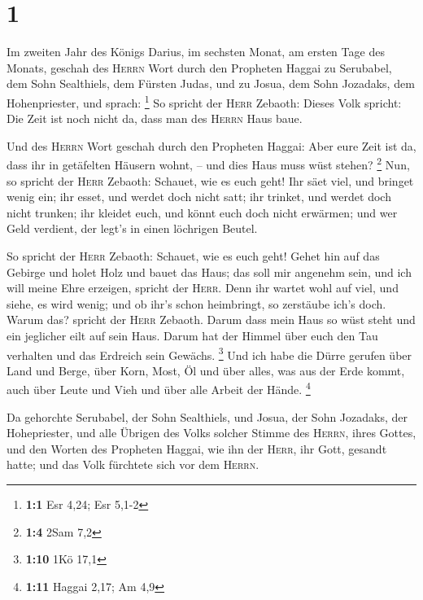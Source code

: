 \hypertarget{section}{%
\section{1}\label{section}}

 Im zweiten Jahr des Königs Darius, im sechsten Monat, am
ersten Tage des Monats, geschah des \textsc{Herrn} Wort durch den
Propheten Haggai zu Serubabel, dem Sohn Sealthiels, dem Fürsten Judas,
und zu Josua, dem Sohn Jozadaks, dem Hohenpriester, und sprach:
\footnote{\textbf{1:1} Esr 4,24; Esr 5,1-2}  So spricht
der \textsc{Herr} Zebaoth: Dieses Volk spricht: Die Zeit ist noch nicht
da, dass man des \textsc{Herrn} Haus baue.

 Und des \textsc{Herrn} Wort geschah durch den Propheten
Haggai:  Aber eure Zeit ist da, dass ihr in getäfelten
Häusern wohnt, -- und dies Haus muss wüst stehen? \footnote{\textbf{1:4}
  2Sam 7,2}  Nun, so spricht der \textsc{Herr} Zebaoth:
Schauet, wie es euch geht!  Ihr säet viel, und bringet
wenig ein; ihr esset, und werdet doch nicht satt; ihr trinket, und
werdet doch nicht trunken; ihr kleidet euch, und könnt euch doch nicht
erwärmen; und wer Geld verdient, der legt's in einen löchrigen Beutel.

 So spricht der \textsc{Herr} Zebaoth: Schauet, wie es
euch geht!  Gehet hin auf das Gebirge und holet Holz und
bauet das Haus; das soll mir angenehm sein, und ich will meine Ehre
erzeigen, spricht der \textsc{Herr}.  Denn ihr wartet wohl
auf viel, und siehe, es wird wenig; und ob ihr's schon heimbringt, so
zerstäube ich's doch. Warum das? spricht der \textsc{Herr} Zebaoth.
Darum dass mein Haus so wüst steht und ein jeglicher eilt auf sein Haus.
 Darum hat der Himmel über euch den Tau verhalten und das
Erdreich sein Gewächs. \footnote{\textbf{1:10} 1Kö 17,1} 
Und ich habe die Dürre gerufen über Land und Berge, über Korn, Most, Öl
und über alles, was aus der Erde kommt, auch über Leute und Vieh und
über alle Arbeit der Hände. \footnote{\textbf{1:11} Haggai 2,17; Am 4,9}

 Da gehorchte Serubabel, der Sohn Sealthiels, und Josua,
der Sohn Jozadaks, der Hohepriester, und alle Übrigen des Volks solcher
Stimme des \textsc{Herrn}, ihres Gottes, und den Worten des Propheten
Haggai, wie ihn der \textsc{Herr}, ihr Gott, gesandt hatte; und das Volk
fürchtete sich vor dem \textsc{Herrn}.

